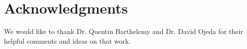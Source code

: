 
\section{Acknowledgments}

We would like to thank Dr. Quentin Barthelemy and Dr. David Ojeda for their helpful comments and ideas on that work. 